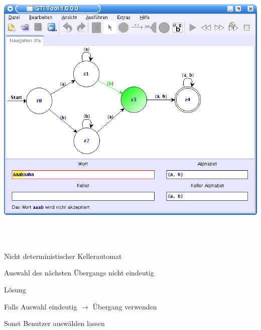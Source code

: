 {
  \begin{center}
    \includegraphics[height=14cm]{../images/dfa_navigation.png}
  \end{center}
}


{
    \begin{itemgroup}{}
	\item Nicht deterministischer Kellerautomat
	\item Auswahl des nächsten Übergangs nicht eindeutig
    \end{itemgroup}

    \begin{itemgroup}{Lösung}
	\item Falls Auswahl eindeutig $\to$ Übergang verwenden
	\item Sonst Benutzer auswählen lassen
	\end{itemgroup}
    
    \vfill{}
}


